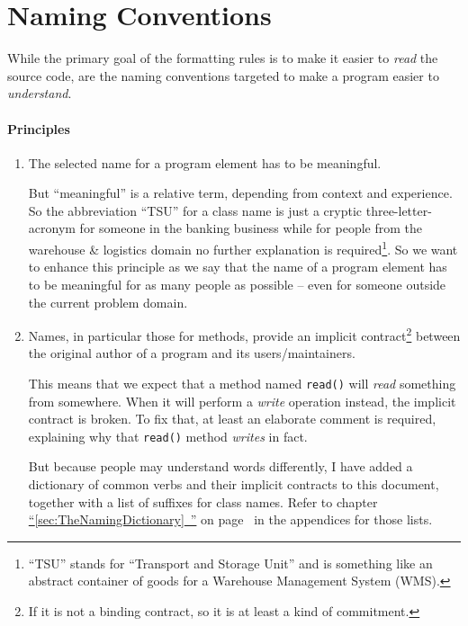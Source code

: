 \documentclass[11pt,a4paper, titlepage, parskip=half, headsepline, footsepline, cleardoublepage=current, headheight=1cm]{scrbook}
\newcommand*{\tqfullvref}[1]{\hyperref[{#1}]{“\ref*{#1}~\nameref*{#1}”} on page~\pageref{#1}}
\begin{document}
\chapter{Naming Conventions}\label{sec:NamingConventions}
While the primary goal of the formatting rules is to make it easier to \textit{read} the source code, are the naming conventions targeted to make a program easier to \textit{understand}.

\subsubsection{Principles}
\begin{enumerate}[label=P\arabic*.]
\item{The selected name for a program element has to be meaningful.

But “meaningful” is a relative term, depending from context and experience. So the abbreviation “TSU” for a class name is just a cryptic three-letter-acronym for someone in the banking business while for people from the warehouse \& logistics domain no further explanation is required\footnote{“TSU” stands for “Transport and Storage Unit” and is something like an abstract container of goods for a Warehouse Management System (WMS).}. So we want to enhance this principle as we say that the name of a program element has to be meaningful for as many people as possible – even for someone outside the current problem domain.}\label{princ:NamingConventions:MeaningfulNames}

\item{Names, in particular those for methods, provide an implicit contract\footnote{If it is not a binding contract, so it is at least a kind of commitment.} between the original author of a program and its users/maintainers.

This means that we expect that a method named \lstinline|read()| will \textit{read} something from somewhere. When it will perform a \textit{write} operation instead, the implicit contract is broken. To fix that, at least an elaborate comment is required, explaining why that \lstinline|read()| method \textit{writes} in fact.

But because people may understand words differently, I have added a dictionary of common verbs and their implicit contracts to this document, together with a list of suffixes for class names. Refer to chapter \tqfullvref{sec:TheNamingDictionary} in the appendices for those lists.}\label{princ:NamingConventions:NamesAsContract}


\end{enumerate}
\end{document}
